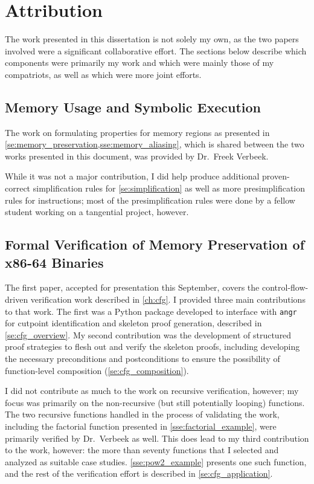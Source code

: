 \chapter{Attribution}\label{attribution}
The work presented in this dissertation is not solely my own,
as the two papers involved were a significant collaborative effort.
The sections below describe which components were primarily my work
and which were mainly those of my compatriots, as well as which were more joint efforts.

\section*{Memory Usage and Symbolic Execution}
The work on formulating properties for memory regions
as presented in \cref{se:memory_preservation,sse:memory_aliasing},
which is shared between the two works presented in this document,
was provided by Dr.~Freek Verbeek.

While it was not a major contribution,
I did help produce additional proven-correct simplification rules
for \cref{se:simplification}
as well as more presimplification rules for instructions;
most of the presimplification rules
were done by a fellow student working on a tangential project, however.

\section*{Formal Verification of Memory Preservation of x86-64 Binaries}\label{attribute1}
The first paper, accepted for presentation this September,
covers the control-flow-driven verification work described in \cref{ch:cfg}.
I provided three main contributions to that work.
The first was a Python package developed to interface with \texttt{angr}
for cutpoint identification and skeleton proof generation,
described in \cref{se:cfg_overview}.
My second contribution was the development of structured proof strategies
to flesh out and verify the skeleton proofs,
including developing the necessary preconditions and postconditions to ensure
the possibility of function-level composition (\cref{se:cfg_composition}).

I did not contribute as much to the work on recursive verification, however;
my focus was primarily on the non-recursive (but still potentially looping) functions.
The two recursive functions handled in the process of validating the work,
including the factorial function presented in \cref{sse:factorial_example},
were primarily verified by Dr.~Verbeek as well.
This does lead to my third contribution to the work, however:
the more than seventy functions that I selected and analyzed as suitable case studies.
\cref{sse:pow2_example} presents one such function,
and the rest of the verification effort is described in \cref{se:cfg_application}.

